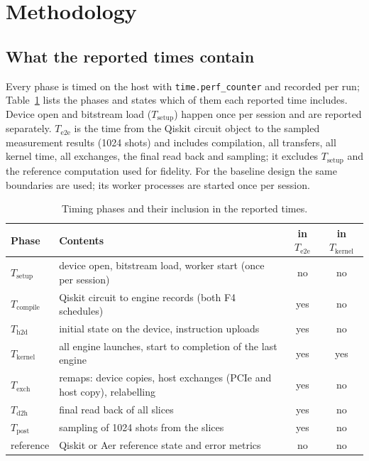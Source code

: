 \documentclass[pdflatex,sn-mathphys-num]{sn-jnl}
\theoremstyle{thmstyleone}
\theoremstyle{thmstylethree}
\begin{document}
\section{Methodology}\label{sec:methodology}

\subsection{What the reported times contain}\label{subsec:timing}

Every phase is timed on the host with \texttt{time.perf\_counter} and recorded per run; Table~\ref{tab:timing} lists
the phases and states which of them each reported time includes. Device open and bitstream load ($T_{\mathrm{setup}}$)
happen once per session and are reported separately. $T_{\mathrm{e2e}}$ is the time from the Qiskit circuit object to
the sampled measurement results (1024 shots) and includes compilation, all transfers, all kernel time, all exchanges,
the final read back and sampling; it excludes $T_{\mathrm{setup}}$ and the reference computation used for fidelity.
For the baseline design the same boundaries are used; its worker processes are started once per session.

\begin{table}[t]
\caption{Timing phases and their inclusion in the reported times.}\label{tab:timing}
\begin{tabular}{@{}llcc@{}}
\toprule
Phase & Contents & in $T_{\mathrm{e2e}}$ & in $T_{\mathrm{kernel}}$ \\
\midrule
$T_{\mathrm{setup}}$ & device open, bitstream load, worker start (once per session) & no & no \\
$T_{\mathrm{compile}}$ & Qiskit circuit to engine records (both F4 schedules) & yes & no \\
$T_{\mathrm{h2d}}$ & initial state on the device, instruction uploads & yes & no \\
$T_{\mathrm{kernel}}$ & all engine launches, start to completion of the last engine & yes & yes \\
$T_{\mathrm{exch}}$ & remaps: device copies, host exchanges (PCIe and host copy), relabelling & yes & no \\
$T_{\mathrm{d2h}}$ & final read back of all slices & yes & no \\
$T_{\mathrm{post}}$ & sampling of 1024 shots from the slices & yes & no \\
reference & Qiskit or Aer reference state and error metrics & no & no \\
\bottomrule
\end{tabular}
\end{table}
\end{document}
